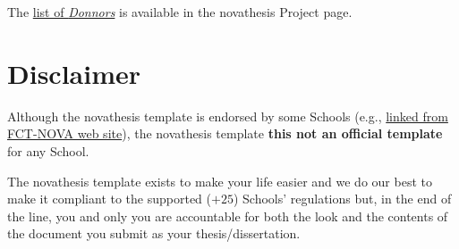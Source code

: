 The \href{https://github.com/joaomlourenco/novathesis/wiki#donators}{list of \emph{Donnors}} is available in the \gls{novathesis} Project page.


\section{Disclaimer}
\label{sec:disclaimer}

Although the \gls{novathesis} template is endorsed by some Schools (e.g., \href{https://www.fct.unl.pt/estudante/informacao-academica/teses-e-dissertacoes}{linked from FCT-NOVA web site}), the \gls{novathesis} template \textbf{this not an official template} for any School.

The \gls{novathesis} template exists to make your life easier and we do our best to make it compliant to the supported ($+25$) Schools' regulations but, in the end of the line, you and only you are accountable for both the look and the contents of the document you submit as your thesis/dissertation.

